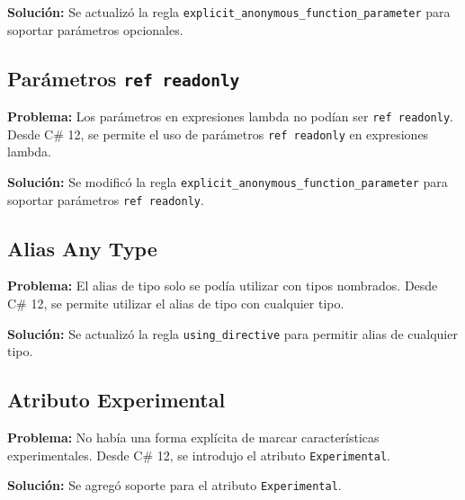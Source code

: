 \textbf{Soluci\'on:} Se actualiz\'o la regla \texttt{explicit\_anonymous\_function\_parameter} para soportar par\'ametros opcionales.

\subsection*{Par\'ametros \texttt{ref readonly}}

\textbf{Problema:} Los par\'ametros en expresiones lambda no pod\'ian ser \texttt{ref readonly}. Desde C\# 12, se permite el uso de par\'ametros \texttt{ref readonly} en expresiones lambda.

\textbf{Soluci\'on:} Se modific\'o la regla \texttt{explicit\_anonymous\_function\_parameter} para soportar par\'ametros \texttt{ref readonly}.

\subsection*{Alias Any Type}

\textbf{Problema:} El alias de tipo solo se pod\'ia utilizar con tipos nombrados. Desde C\# 12, se permite utilizar el alias de tipo con cualquier tipo.

\textbf{Soluci\'on:} Se actualiz\'o la regla \texttt{using\_directive} para permitir alias de cualquier tipo.

\subsection*{Atributo Experimental}

\textbf{Problema:} No hab\'ia una forma expl\'icita de marcar caracter\'isticas experimentales. Desde C\# 12, se introdujo el atributo \texttt{Experimental}.

\textbf{Soluci\'on:} Se agreg\'o soporte para el atributo \texttt{Experimental}.

